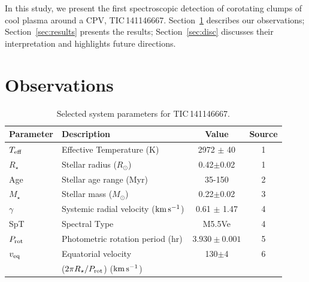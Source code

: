 \documentclass[11pt,twocolumn,tighten,linenumbers]{aastex7}
\newcommand{\kms}{\ensuremath{\rm km\,s^{-1}}}
\begin{document}
In this study, we present the first spectroscopic detection of
corotating clumps of cool plasma around a CPV, TIC\,141146667.
Section~\ref{sec:obs} describes our observations;
Section~\ref{sec:results} presents the results; Section~\ref{sec:disc}
discusses their interpretation and highlights future directions.


\section{Observations}
\label{sec:obs}

\begin{table}
\small
\setlength{\tabcolsep}{2pt}
\centering
\caption{Selected system parameters for TIC\,141146667.}
\vspace{-0.2cm}
\label{tab:params}
\begin{tabular}{llcc}
\hline \hline
Parameter & Description & Value & Source\\
\hline 
%
$T_{\rm eff}$\dotfill                   & Effective Temperature (K) \hspace{9pt}\dotfill                 & 2972 $\pm$ 40    & 1 \\
%
$R_\star$\dotfill                       & Stellar radius ($R_\odot$)\dotfill                             & 0.42$\pm$0.02    & 1 \\
%
Age                                     & Stellar age range (Myr)\dotfill                                & 35-150           & 2 \\
%
$M_\star$\dotfill                       & Stellar mass ($M_\odot$)\dotfill                               & 0.22$\pm$0.02    & 3 \\
%
$\gamma$\dotfill                        & Systemic radial velocity (\kms)\dotfill                        & 0.61 $\pm$ 1.47  & 4 \\
%
SpT\dotfill                             & Spectral Type\dotfill                                          & M5.5Ve           & 4 \\
%
$P_{\rm rot}$\dotfill                   & Photometric rotation period (hr)\dotfill                       & $3.930\pm 0.001$ & 5 \\
%
$v_{\rm eq}$\dotfill		                & Equatorial velocity \dotfill                                   &  130$\pm$4       & 6 \\
                                        & \hspace{3pt} ($2\pi R_\star/P_{\rm rot}$) (\kms)	             &                      \\

\end{tabular}
\end{table}
\end{document}
